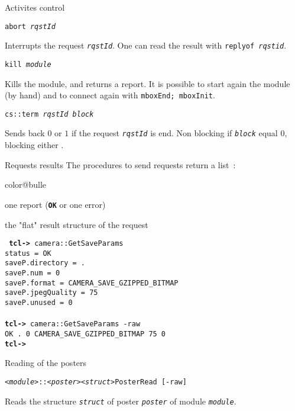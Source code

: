 \documentclass[a4paper,landscape,smooth]{show}
\begin{document}
\begin{tslide}{Activites control}
   \vfill
   \begin{cartouche}
      \tt abort {\em rqstId}
   \end{cartouche}
   Interrupts the request {\tt\em rqstId}. One can read the result with
   {\tt replyof \em rqstid}.
   \vfill
   \begin{cartouche}
      \tt kill {\em module}
   \end{cartouche}
   Kills the module, and returns a report. It is possible to start again the
   module (by hand) and to connect again with {\tt mboxEnd; mboxInit}.
   \vfill
   \begin{cartouche}
      \tt cs::term {\em rqstId} {\em block}
   \end{cartouche}
   Sends back $0$ or $1$ if the request {\tt\em rqstId} is end. Non
   blocking if {\tt\em block} equal 0, blocking either .
   \vfill
\end{tslide}


\begin{tslide}{Requests results}
   \vfill
   The procedures to send requests return a list~:
   \begin{bitemize}{color@bulle}
      \item one report ({\bfseries\tt OK} or one error)
      \item the "flat" result structure of the request
   \end{bitemize}
   \vfill
   {\tt
   {\bf tcl->} camera::GetSaveParams \\
   status = OK\\
   saveP.directory = .\\
   saveP.num = 0\\
   saveP.format = CAMERA\_SAVE\_GZIPPED\_BITMAP\\
   saveP.jpegQuality = 75\\
   saveP.unused = 0\\
\\
   {\bf tcl->} camera::GetSaveParams -raw\\
   OK . 0 CAMERA\_SAVE\_GZIPPED\_BITMAP 75 0\\
   {\bf tcl->}}
   \vfill
\end{tslide}


\begin{tslide}{Reading of the posters}
   \vfill
   \begin{cartouche}
      \tt {\em <module>}::{\em <poster>}{\em <struct>}PosterRead [-raw]
   \end{cartouche}
   Reads the structure {\tt\em struct} of poster {\tt\em poster} of module
   {\tt\em module}.
   \vfill
\end{tslide}
\end{document}
